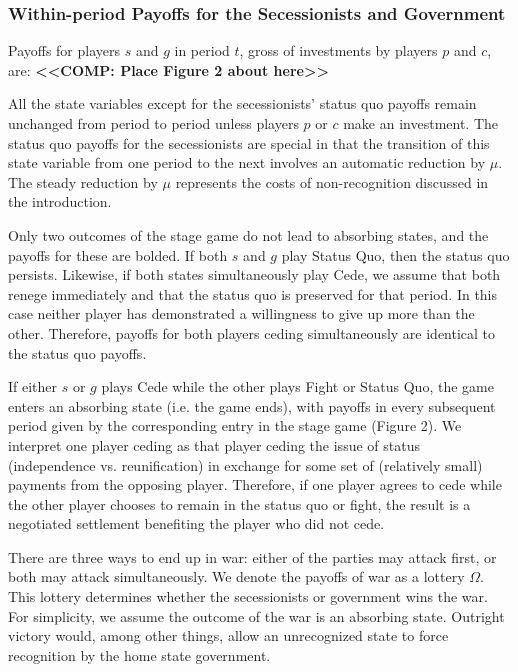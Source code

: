 \subsubsection{Within-period Payoffs for the Secessionists and Government}
\label{sec:stage}

\noindent Payoffs for players $s$ and $g$ in period $t$, gross of investments by players $p$ and $c$, are:
\vspace{2pt}
\textbf{<<COMP: Place Figure 2 about here>>}
\vspace{2.5pt}

All the state variables except for the secessionists' status quo payoffs remain unchanged from period to period unless players $p$ or $c$ make an investment. The status quo payoffs for the secessionists are special in that the transition of this state variable from one period to the next involves an automatic reduction by $\mu$. The steady reduction by $\mu$ represents the costs of non-recognition discussed in the introduction.

Only two outcomes of the stage game do not lead to absorbing states, and the payoffs for these are bolded. If both $s$ and $g$ play Status Quo, then the status quo persists. Likewise, if both states simultaneously play Cede, we assume that both renege immediately and that the status quo is preserved for that period. In this case neither player has demonstrated a willingness to give up more than the other. Therefore, payoffs for both players ceding simultaneously are identical to the status quo payoffs.

If either $s$ or $g$ plays Cede while the other plays Fight or Status Quo, the game enters an absorbing state (i.e. the game ends), with payoffs in every subsequent period given by the corresponding entry in the stage game (Figure 2). We interpret one player ceding as that player ceding the issue of status (independence vs. reunification) in exchange for some set of (relatively small) payments from the opposing player. Therefore, if one player agrees to cede while the other player chooses to remain in the status quo or fight, the result is a negotiated settlement benefiting the player who did not cede. 

There are three ways to end up in war: either of the parties may attack first, or both may attack simultaneously. We denote the payoffs of war as a lottery $\Omega$. This lottery determines whether the secessionists or government wins the war. For simplicity, we assume the outcome of the war is an absorbing state. Outright victory would, among other things, allow an unrecognized state to force recognition by the home state government.

